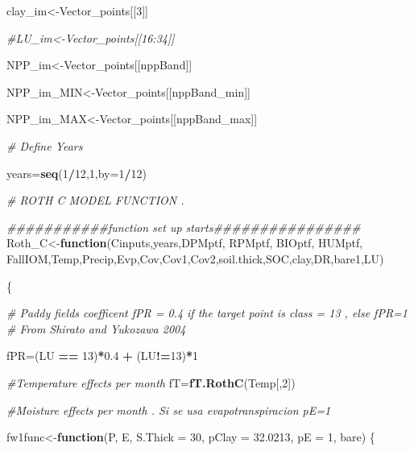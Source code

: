 \documentclass[
  10pt,
  b5paper,
]{book}
\newenvironment{Shaded}{\begin{snugshade}}{\end{snugshade}}
\newcommand{\CommentTok}[1]{\textcolor[rgb]{0.56,0.35,0.01}{\textit{#1}}}
\newcommand{\ControlFlowTok}[1]{\textcolor[rgb]{0.13,0.29,0.53}{\textbf{#1}}}
\newcommand{\DataTypeTok}[1]{\textcolor[rgb]{0.13,0.29,0.53}{#1}}
\newcommand{\DecValTok}[1]{\textcolor[rgb]{0.00,0.00,0.81}{#1}}
\newcommand{\FloatTok}[1]{\textcolor[rgb]{0.00,0.00,0.81}{#1}}
\newcommand{\KeywordTok}[1]{\textcolor[rgb]{0.13,0.29,0.53}{\textbf{#1}}}
\newcommand{\NormalTok}[1]{#1}
\newcommand{\OperatorTok}[1]{\textcolor[rgb]{0.81,0.36,0.00}{\textbf{#1}}}
\newcommand{\StringTok}[1]{\textcolor[rgb]{0.31,0.60,0.02}{#1}}
\begin{document}
\begin{Shaded}
\begin{Highlighting}[]
\NormalTok{clay_im<-Vector_points[[}\DecValTok{3}\NormalTok{]] }

\CommentTok{#LU_im<-Vector_points[[16:34]]}

\NormalTok{NPP_im<-Vector_points[[nppBand]]}

\NormalTok{NPP_im_MIN<-Vector_points[[nppBand_min]]}

\NormalTok{NPP_im_MAX<-Vector_points[[nppBand_max]]}

\CommentTok{# Define Years}

\NormalTok{years=}\KeywordTok{seq}\NormalTok{(}\DecValTok{1}\OperatorTok{/}\DecValTok{12}\NormalTok{,}\DecValTok{1}\NormalTok{,}\DataTypeTok{by=}\DecValTok{1}\OperatorTok{/}\DecValTok{12}\NormalTok{)}


\CommentTok{# ROTH C MODEL FUNCTION . }

\CommentTok{###########function set up starts################}
\NormalTok{Roth_C<-}\ControlFlowTok{function}\NormalTok{(Cinputs,years,DPMptf, RPMptf, BIOptf, HUMptf, FallIOM,Temp,Precip,Evp,Cov,Cov1,Cov2,soil.thick,SOC,clay,DR,bare1,LU)}

\NormalTok{\{}

\CommentTok{# Paddy fields coefficent fPR = 0.4 if the target point is class = 13 , else fPR=1}
\CommentTok{# From Shirato and Yukozawa 2004}

\NormalTok{fPR=(LU }\OperatorTok{==}\StringTok{ }\DecValTok{13}\NormalTok{)}\OperatorTok{*}\FloatTok{0.4} \OperatorTok{+}\StringTok{ }\NormalTok{(LU}\OperatorTok{!=}\DecValTok{13}\NormalTok{)}\OperatorTok{*}\DecValTok{1}

\CommentTok{#Temperature effects per month}
\NormalTok{fT=}\KeywordTok{fT.RothC}\NormalTok{(Temp[,}\DecValTok{2}\NormalTok{]) }

\CommentTok{#Moisture effects per month . Si se usa evapotranspiracion pE=1}

\NormalTok{fw1func<-}\ControlFlowTok{function}\NormalTok{(P, E, }\DataTypeTok{S.Thick =} \DecValTok{30}\NormalTok{, }\DataTypeTok{pClay =} \FloatTok{32.0213}\NormalTok{, }\DataTypeTok{pE =} \DecValTok{1}\NormalTok{, bare) }
\NormalTok{\{}
   

\end{Highlighting}
\end{Shaded}
\end{document}
